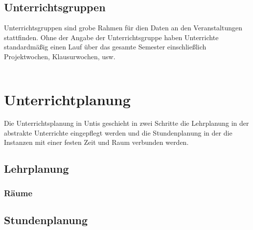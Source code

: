 \documentclass[]{report}
\begin{document}
\newpage
\section{Unterrichtsgruppen}

Unterrichtsgruppen sind grobe Rahmen für dien Daten an den Veranstaltungen stattfinden. Ohne der Angabe der Unterrichtsgruppe haben Unterrichte standardmäßig einen Lauf über das gesamte Semester einschließlich Projektwochen, Klausurwochen, usw.\\
\\


\chapter{Unterrichtplanung}

Die Unterrichtsplanung in Untis geschieht in zwei Schritte die Lehrplanung in der abstrakte Unterrichte eingepflegt werden und die Stundenplanung in der die Instanzen mit einer festen Zeit und Raum verbunden werden.

\section{Lehrplanung}
\label{sec:lehrplanung}


\subsection{Räume}
\label{subsec:rooms}

\section{Stundenplanung}
\end{document}
